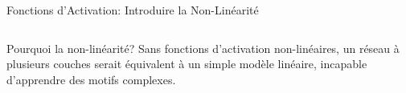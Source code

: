 \documentclass[aspectratio=169,11pt]{beamer}
\begin{document}
\begin{frame}{Fonctions d'Activation: Introduire la Non-Linéarité}
\begin{columns}
\begin{column}{0.45\textwidth}
\begin{center}
            \end{center}
            \begin{alertblock}{Pourquoi la non-linéarité?}
                Sans fonctions d'activation non-linéaires, un réseau à plusieurs couches serait équivalent à un simple modèle linéaire, incapable d'apprendre des motifs complexes.
            \end{alertblock}
        \end{column}
    \end{columns}
\end{frame}
\end{document}
